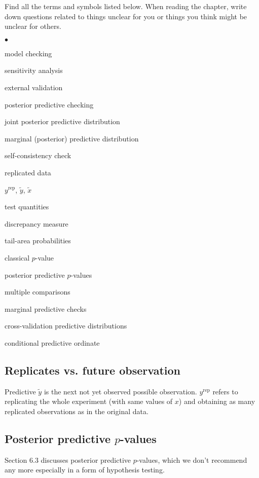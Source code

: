 \documentclass[a4paper,11pt,english]{article}
\DeclareMathOperator{\rep}{\mathrm{rep}}
\begin{document}
Find all the terms and symbols listed below. When reading the chapter,
write down questions related to things unclear for you or things you
think might be unclear for others.
\begin{list}{$\bullet$}{\parsep=0pt\itemsep=2pt}
\item model checking
\item sensitivity analysis
\item external validation
\item posterior predictive checking
\item joint posterior predictive distribution
\item marginal (posterior) predictive distribution
\item self-consistency check
\item replicated data
\item $y^{\rep}$, $\tilde{y}$, $\tilde{x}$
\item test quantities
\item discrepancy measure
\item tail-area probabilities
\item classical $p$-value
\item posterior predictive $p$-values
\item multiple comparisons
\item marginal predictive checks
\item cross-validation predictive distributions
\item conditional predictive ordinate
\end{list}

 \subsection*{Replicates vs. future observation}

 Predictive $\tilde{y}$ is the next not yet observed possible
 observation. $y^{\mathrm{rep}}$ refers to replicating the whole
 experiment (with same values of $x$) and obtaining as many replicated
 observations as in the original data.

 \subsection*{Posterior predictive $p$-values}

 Section 6.3 discusses posterior predictive $p$-values, which we don't
 recommend any more especially in a form of hypothesis testing.
\end{document}
